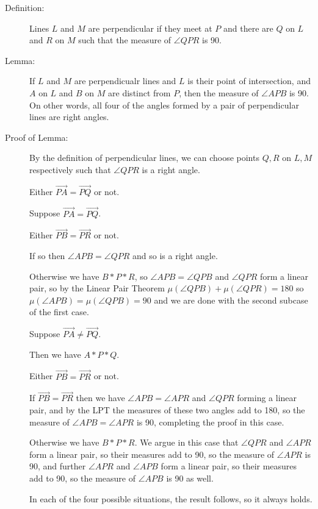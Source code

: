 \documentclass[12pt]{article}
\begin{document}
\begin{description}

\item[Definition:]  Lines $L$ and $M$ are perpendicular if they meet at $P$ and there are $Q$ on $L$ and $R$ on $M$ such that the measure of $\angle QPR$ is 90.

\item[Lemma:]  If $L$ and $M$ are perpendicualr lines and $L$ is their point of intersection, and $A$ on $L$ and $B$ on $M$ are distinct from $P$, then the measure of $\angle APB$ is 90.  On other words, all four of the angles formed by a pair of perpendicular lines are right angles.

\item[Proof of Lemma:]  By the definition of perpendicular lines, we can choose points $Q,R$ on $L,M$ respectively such that $\angle QPR$ is a right angle.

Either $\overrightarrow {PA} = \overrightarrow{ PQ}$ or not.

Suppose $\overrightarrow{ PA} = \overrightarrow {PQ}$.

Either $\overrightarrow {PB} = \overrightarrow {PR}$ or not.

If so then $\angle APB = \angle QPR$ and so is a right angle.

Otherwise we have $B*P*R$, so $\angle APB = \angle QPB$ and $\angle QPR$ form a linear pair, so by the Linear Pair Theorem $\mu(\angle QPB)+ \mu(\angle QPR) = 180$
so $\mu(\angle APB) = \mu(\angle QPB) = 90$ and we are done with the second subcase of the first case.

Suppose  $\overrightarrow {PA} \neq \overrightarrow {PQ}$.

Then we have $A*P*Q$.

Either $\overrightarrow {PB} = \overrightarrow {PR}$ or not.

If $\overrightarrow{ PB} = \overrightarrow{ PR}$ then we have $\angle APB = \angle APR$ and $\angle QPR$ forming a linear pair, and by the LPT the measures of these two angles add to 180, so the measure of $\angle APB = \angle APR$ is 90, completing the proof in this case.

Otherwise we have $B*P*R$.  We argue in this case that $\angle QPR$ and $\angle APR$ form a linear pair, so their measures add to 90, so the measure of
$\angle APR$ is 90, and further $\angle APR$ and $\angle APB$ form a linear pair, so their measures add to 90, so the measure of $\angle APB$ is 90 as well.

In each of the four possible situations, the result follows, so it always holds.


\end{description}
\end{document}
